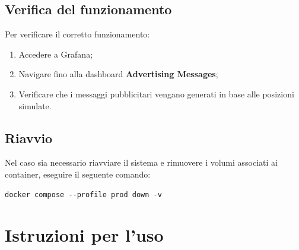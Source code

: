 \documentclass[10pt]{article}
\begin{document}
\begin{justify}
\subsection{Verifica del funzionamento}
Per verificare il corretto funzionamento:
\begin{enumerate}
    \item Accedere a Grafana;
    \item Navigare fino alla dashboard \textbf{Advertising Messages};
    \item Verificare che i messaggi pubblicitari vengano generati in base alle posizioni simulate.
\end{enumerate}

\subsection{Riavvio}
Nel caso sia necessario riavviare il sistema e rimuovere i volumi associati ai container, eseguire il seguente comando:
\begin{verbatim}
docker compose --profile prod down -v
\end{verbatim}


\newpage


\section{Istruzioni per l'uso} %
\label{sec:uso}


\end{justify}
\end{document}
